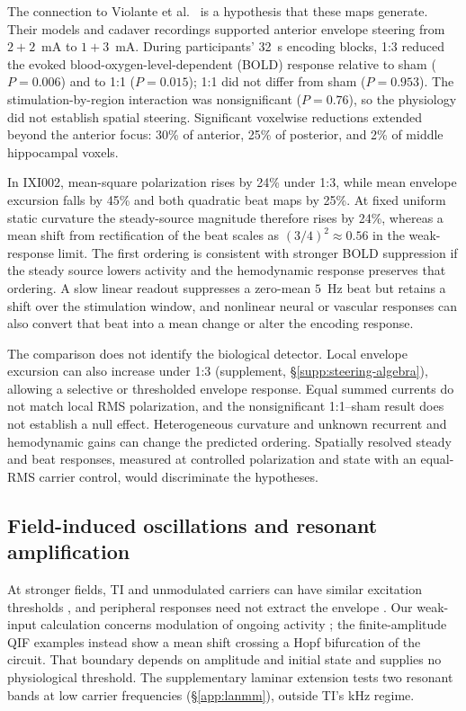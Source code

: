 The connection to Violante et al.\ \cite{violante2023} is a hypothesis that these maps generate. Their models and cadaver recordings supported anterior envelope
steering from $2+2$~mA to $1+3$~mA. During participants' 32~s encoding blocks,
1:3 reduced the evoked blood-oxygen-level-dependent (BOLD) response relative
to sham ($P=0.006$) and to 1:1 ($P=0.015$); 1:1 did not differ from sham
($P=0.953$). The stimulation-by-region interaction was nonsignificant
($P=0.76$), so the physiology did not establish spatial steering. Significant
voxelwise reductions extended beyond the anterior focus: 30\% of anterior,
25\% of posterior, and 2\% of middle hippocampal voxels.

In IXI002, mean-square polarization rises by 24\% under 1:3, while mean
envelope excursion falls by 45\% and both quadratic beat maps by 25\%.
At fixed uniform static curvature the steady-source magnitude therefore rises
by 24\%, whereas a mean shift from rectification of the beat scales as
$(3/4)^2\approx0.56$ in the weak-response limit. The first ordering is
consistent with stronger BOLD suppression if the steady source lowers activity
and the hemodynamic response preserves that ordering. A slow linear readout
suppresses a zero-mean $5$~Hz beat but retains a shift over the stimulation
window, and nonlinear neural or vascular responses can also convert that beat
into a mean change or alter the encoding response.

The comparison does not identify the biological detector. Local envelope excursion
can also increase under 1:3 (supplement, \S\ref{supp:steering-algebra}), allowing
a selective or thresholded envelope response. Equal summed currents do not match
local RMS polarization, and the nonsignificant 1:1--sham result does not establish
a null effect. Heterogeneous curvature and unknown recurrent and hemodynamic gains
can change the predicted ordering. Spatially resolved steady and beat responses,
measured at controlled polarization and state with an equal-RMS carrier control,
would discriminate the hypotheses.
\ifjne\else

\fi

\subsection{Field-induced oscillations and resonant amplification}
At stronger fields, TI and unmodulated carriers can have similar excitation
thresholds \cite{opancar2025,semenov2025}, and peripheral responses need not
extract the envelope \cite{peripheral2023}. Our weak-input calculation concerns
modulation of ongoing activity \cite{vieira2024}; the finite-amplitude QIF examples
instead show a mean shift crossing a Hopf bifurcation of the circuit. That
boundary depends on amplitude and initial state and supplies no physiological
threshold. The supplementary laminar extension tests two resonant bands at low
carrier frequencies (\S\ref{app:lanmm}), outside TI's kHz regime.


